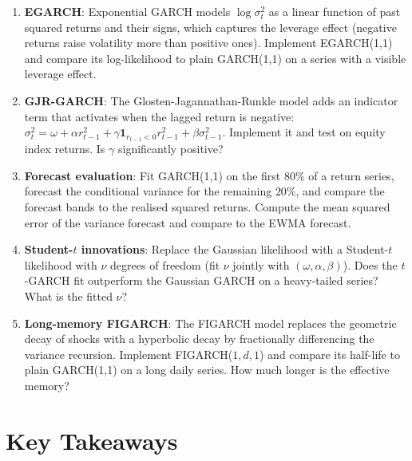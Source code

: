 \begin{enumerate}
    \item \textbf{EGARCH}: Exponential GARCH models $\log \sigma_t^2$ as a
      linear function of past squared returns and their signs, which captures
      the leverage effect (negative returns raise volatility more than
      positive ones). Implement EGARCH(1,1) and compare its log-likelihood
      to plain GARCH(1,1) on a series with a visible leverage effect.

    \item \textbf{GJR-GARCH}: The Glosten-Jagannathan-Runkle model adds an
      indicator term that activates when the lagged return is negative:
      $\sigma_t^2 = \omega + \alpha r_{t-1}^2 + \gamma \mathbf{1}_{r_{t-1}<0}
      r_{t-1}^2 + \beta \sigma_{t-1}^2$. Implement it and test on equity
      index returns. Is $\gamma$ significantly positive?

    \item \textbf{Forecast evaluation}: Fit GARCH(1,1) on the first $80\%$ of
      a return series, forecast the conditional variance for the remaining
      $20\%$, and compare the forecast bands to the realised squared returns.
      Compute the mean squared error of the variance forecast and compare to
      the EWMA forecast.

    \item \textbf{Student-$t$ innovations}: Replace the Gaussian likelihood
      with a Student-$t$ likelihood with $\nu$ degrees of freedom (fit $\nu$
      jointly with $(\omega, \alpha, \beta)$). Does the $t$-GARCH fit
      outperform the Gaussian GARCH on a heavy-tailed series? What is the
      fitted $\nu$?

    \item \textbf{Long-memory FIGARCH}: The FIGARCH model replaces the
      geometric decay of shocks with a hyperbolic decay by fractionally
      differencing the variance recursion. Implement FIGARCH($1, d, 1$) and
      compare its half-life to plain GARCH(1,1) on a long daily series. How
      much longer is the effective memory?
\end{enumerate}

\section{Key Takeaways}

